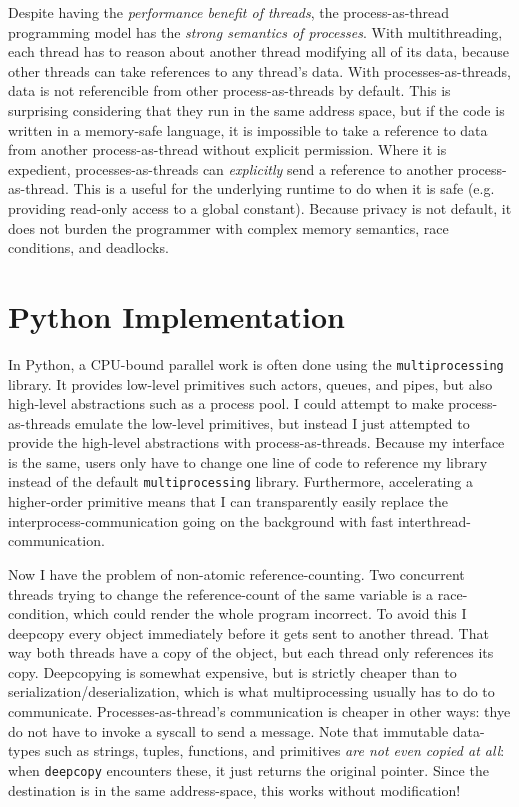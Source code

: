 \documentclass[letterpaper,twocolumn,10pt]{article}
\begin{document}
Despite having the \textit{performance benefit of threads}, the process-as-thread programming model has the \textit{strong semantics of processes}.
With multithreading, each thread has to reason about another thread modifying all of its data, because other threads can take references to any thread's data.
With processes-as-threads, data is not referencible from other process-as-threads by default.
This is surprising considering that they run in the same address space, but if the code is written in a memory-safe language, it is impossible to take a reference to data from another process-as-thread without explicit permission.
Where it is expedient, processes-as-threads can \textit{explicitly} send a reference to another process-as-thread.
This is a useful for the underlying runtime to do when it is safe (e.g. providing read-only access to a global constant).
Because privacy is not default, it does not burden the programmer with complex memory semantics, race conditions, and deadlocks.

\section{Python Implementation}

In Python, a CPU-bound parallel work is often done using the \texttt{multiprocessing} library.
It provides low-level primitives such actors, queues, and pipes, but also high-level abstractions such as a process pool.
I could attempt to make process-as-threads emulate the low-level primitives, but instead I just attempted to provide the high-level abstractions with process-as-threads.
Because my interface is the same, users only have to change one line of code to reference my library instead of the default \texttt{multiprocessing} library.
Furthermore, accelerating a higher-order primitive means that I can transparently easily replace the interprocess-communication going on the background with fast interthread-communication.

Now I have the problem of non-atomic reference-counting.
Two concurrent threads trying to change the reference-count of the same variable is a race-condition, which could render the whole program incorrect.
To avoid this I deepcopy every object immediately before it gets sent to another thread.
That way both threads have a copy of the object, but each thread only references its copy.
Deepcopying is somewhat expensive, but is strictly cheaper than to serialization/deserialization, which is what multiprocessing usually has to do to communicate.
Processes-as-thread's communication is cheaper in other ways: thye do not have to invoke a syscall to send a message.
Note that immutable data-types such as strings, tuples, functions, and primitives \textit{are not even copied at all}: when \texttt{deepcopy} encounters these, it just returns the original pointer. Since the destination is in the same address-space, this works without modification!
\end{document}
